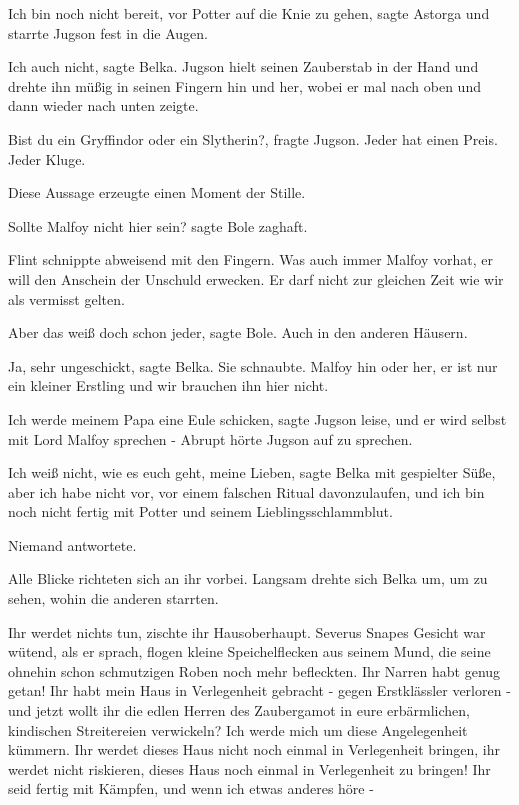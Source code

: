 \glqq{}Ich bin noch nicht bereit, vor Potter auf die Knie zu gehen\grqq{}, sagte
Astorga und starrte Jugson fest in die Augen.

\glqq{}Ich auch nicht\grqq{}, sagte Belka. Jugson hielt seinen Zauberstab in der
Hand und drehte ihn müßig in seinen Fingern hin und her, wobei er mal nach oben
und dann wieder nach unten zeigte.

\glqq{}Bist du ein Gryffindor oder ein Slytherin?\grqq{}, fragte Jugson. \glqq{}
Jeder hat einen Preis. Jeder Kluge.\grqq{}

Diese Aussage erzeugte einen Moment der Stille.

\glqq{}Sollte Malfoy nicht hier sein?\grqq{} sagte Bole zaghaft.

Flint schnippte abweisend mit den Fingern. \glqq{}Was auch immer Malfoy vorhat,
er will den Anschein der Unschuld erwecken. Er darf nicht zur gleichen Zeit wie
wir als vermisst gelten.\grqq{}

\glqq{}Aber das weiß doch schon jeder\grqq{}, sagte Bole. \glqq{}Auch in den
anderen Häusern.\grqq{}

\glqq{}Ja, sehr ungeschickt\grqq{}, sagte Belka. Sie schnaubte. \glqq{}Malfoy hin
oder her, er ist nur ein kleiner Erstling und wir brauchen ihn hier
nicht.\grqq{}

\glqq{}Ich werde meinem Papa eine Eule schicken\grqq{}, sagte Jugson leise,
\glqq{}und er wird selbst mit Lord Malfoy sprechen -\grqq{} Abrupt hörte Jugson
auf zu sprechen.

\glqq{}Ich weiß nicht, wie es euch geht, meine Lieben\grqq{}, sagte Belka mit
gespielter Süße, \glqq{}aber ich habe nicht vor, vor einem falschen Ritual
davonzulaufen, und ich bin noch nicht fertig mit Potter und seinem
Lieblingsschlammblut.\grqq{}

Niemand antwortete.

Alle Blicke richteten sich an ihr vorbei. Langsam drehte sich Belka um, um zu
sehen, wohin die anderen starrten.

\glqq{}Ihr werdet nichts tun\grqq{}, zischte ihr Hausoberhaupt. Severus Snapes
Gesicht war wütend, als er sprach, flogen kleine Speichelflecken aus seinem
Mund, die seine ohnehin schon schmutzigen Roben noch mehr befleckten. \glqq{}Ihr
Narren habt genug getan! Ihr habt mein Haus in Verlegenheit gebracht - gegen
Erstklässler verloren - und jetzt wollt ihr die edlen Herren des Zaubergamot in
eure erbärmlichen, kindischen Streitereien verwickeln? Ich werde mich um diese
Angelegenheit kümmern. Ihr werdet dieses Haus nicht noch einmal in Verlegenheit
bringen, ihr werdet nicht riskieren, dieses Haus noch einmal in Verlegenheit zu
bringen! Ihr seid fertig mit Kämpfen, und wenn ich etwas anderes höre -\grqq{}

